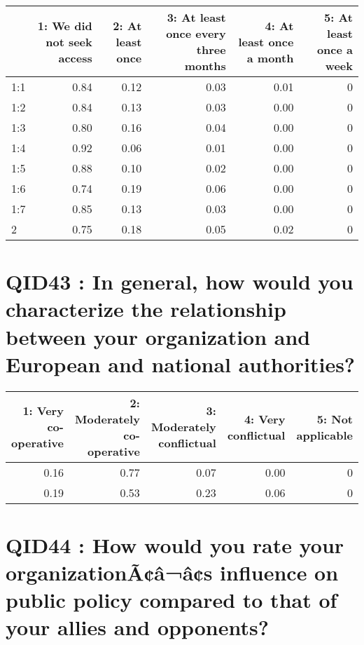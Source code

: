 \documentclass[]{article}
\begin{document}
\begin{table}[H]
\centering\begingroup\fontsize{30}{32}\selectfont

\begin{tabular}{l|r|r|r|r|r}
\hline
  & 1: We did not seek access &  2: At least once &  3: At least once every three months &  4: At least once a month &  5: At least once a week\\
\hline
1:1 & 0.84 & 0.12 & 0.03 & 0.01 & 0\\
\hline
1:2 & 0.84 & 0.13 & 0.03 & 0.00 & 0\\
\hline
1:3 & 0.80 & 0.16 & 0.04 & 0.00 & 0\\
\hline
1:4 & 0.92 & 0.06 & 0.01 & 0.00 & 0\\
\hline
1:5 & 0.88 & 0.10 & 0.02 & 0.00 & 0\\
\hline
1:6 & 0.74 & 0.19 & 0.06 & 0.00 & 0\\
\hline
1:7 & 0.85 & 0.13 & 0.03 & 0.00 & 0\\
\hline
2 & 0.75 & 0.18 & 0.05 & 0.02 & 0\\
\hline
\end{tabular}
\endgroup{}
\end{table}

\section{QID43 : In general, how would you characterize the relationship
between your organization and European and national
authorities?}\label{qid43-in-general-how-would-you-characterize-the-relationship-between-your-organization-and-european-and-national-authorities}

\begin{table}[H]
\centering\begingroup\fontsize{30}{32}\selectfont

\begin{tabular}{r|r|r|r|r}
\hline
1: Very co-operative &  2: Moderately co-operative &  3: Moderately conflictual &  4: Very conflictual &  5: Not applicable\\
\hline
0.16 & 0.77 & 0.07 & 0.00 & 0\\
\hline
0.19 & 0.53 & 0.23 & 0.06 & 0\\
\hline
\end{tabular}
\endgroup{}
\end{table}

\section{QID44 : How would you rate your organizationÃ¢â¬â¢s influence
on public policy compared to that of your allies and
opponents?}\label{qid44-how-would-you-rate-your-organizationaaas-influence-on-public-policy-compared-to-that-of-your-allies-and-opponents}
\end{document}
